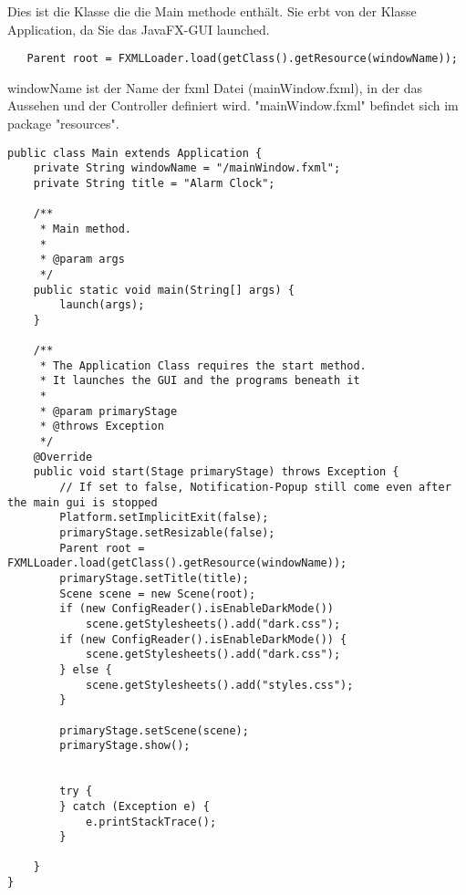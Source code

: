 
Dies ist die Klasse die die Main methode enthält. Sie erbt von der Klasse Application, da Sie das JavaFX-GUI launched.
\begin{lstlisting}
   Parent root = FXMLLoader.load(getClass().getResource(windowName));
\end{lstlisting}
windowName ist der Name der fxml Datei (mainWindow.fxml), in der das Aussehen und der Controller definiert wird. "mainWindow.fxml" befindet sich im package "resources".

\begin{lstlisting}
public class Main extends Application {
    private String windowName = "/mainWindow.fxml";
    private String title = "Alarm Clock";

    /**
     * Main method.
     *
     * @param args
     */
    public static void main(String[] args) {
        launch(args);
    }

    /**
     * The Application Class requires the start method.
     * It launches the GUI and the programs beneath it
     *
     * @param primaryStage
     * @throws Exception
     */
    @Override
    public void start(Stage primaryStage) throws Exception {
        // If set to false, Notification-Popup still come even after the main gui is stopped
        Platform.setImplicitExit(false);
        primaryStage.setResizable(false);
        Parent root = FXMLLoader.load(getClass().getResource(windowName));
        primaryStage.setTitle(title);
        Scene scene = new Scene(root);
        if (new ConfigReader().isEnableDarkMode())
            scene.getStylesheets().add("dark.css");
        if (new ConfigReader().isEnableDarkMode()) {
            scene.getStylesheets().add("dark.css");
        } else {
            scene.getStylesheets().add("styles.css");
        }

        primaryStage.setScene(scene);
        primaryStage.show();


        try {
        } catch (Exception e) {
            e.printStackTrace();
        }

    }
}
\end{lstlisting}
